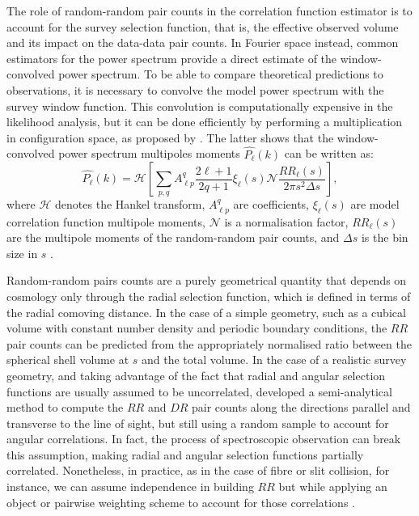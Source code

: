 \documentclass{aa}
\begin{document}
The role of random-random pair counts in the correlation function estimator is to account for the survey selection function, that is, the effective observed volume and its impact on the data-data pair counts. In Fourier space instead, common estimators for the power spectrum \citep[e.g.][]{feldman1994power,yamamoto2006measurement} provide a direct estimate of the window-convolved power spectrum. To be able to compare theoretical predictions to observations, it is necessary to convolve the model power spectrum with the survey window function. This convolution is computationally expensive in the likelihood analysis, but it can be done efficiently by performing a multiplication in configuration space, as proposed by \cite{wilson2017rapid}. The latter shows that the window-convolved power spectrum multipoles moments $\hat{P_\ell}(k)$ can be written as:
\begin{equation} \label{eq:windowedcf}
    \hat{P_\ell}(k) = \mathcal{H}\left[\sum_{p,q} A^q_{\ell p} \frac{2\ell+1}{2q+1} \xi_\ell(s) \mathcal{N} \frac{RR_\ell(s)}{2\pi s^2 \Delta s}\right],
\end{equation} 
where $\mathcal{H}$ denotes the Hankel transform, $A^q_{\ell p}$ are coefficients, $\xi_\ell(s)$ are model correlation function multipole moments, $\mathcal{N}$ is a normalisation factor, $RR_\ell(s)$ are the multipole moments of the random-random pair counts, and $\Delta s$ is the bin size in $s$ \citep{wilson2017rapid,beutler2017clustering}.

Random-random pairs counts are a purely geometrical quantity that depends on cosmology only through the radial selection function, which is defined in terms of the radial comoving distance. 
In the case of a simple geometry, such as a cubical volume with constant number density and periodic boundary conditions, the $RR$ pair counts can be predicted from the appropriately normalised ratio between the spherical shell volume at $s$ and the total volume. In the case of a realistic survey geometry, and taking advantage of the fact that radial and angular selection functions are usually assumed to be uncorrelated, \citet{demina2018computationally} developed a semi-analytical method to compute the $RR$ and $DR$ pair counts along the directions parallel and transverse to the line of sight, but still using a random sample to account for angular correlations. In fact, the process of spectroscopic observation can break this assumption, making radial and angular selection functions partially correlated. Nonetheless, in practice, as in the case of fibre or slit collision, for instance, we can assume independence in building $RR$ but while applying an object or pairwise weighting scheme to account for those correlations \citep[e.g.][]{delatorre2013vipers,bianchi2017,ross2017}.
\end{document}
